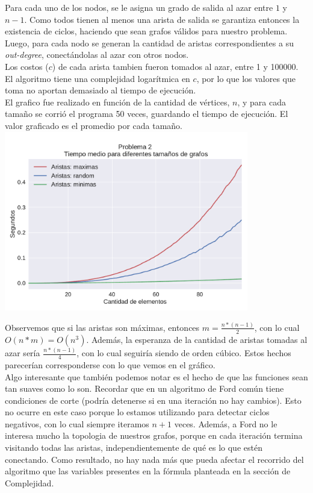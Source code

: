 Para cada uno de los nodos, se le asigna un grado de salida al azar entre $1$ y $n-1$. Como todos tienen al menos una arista de salida se garantiza entonces la existencia de ciclos, haciendo que sean grafos válidos para nuestro problema. Luego, para cada nodo se generan la cantidad de aristas correspondientes a su \textit{out-degree}, conectándolas al azar con otros nodos. \\

Los costos ($c$) de cada arista tambien fueron tomados al azar, entre 1 y 100000. El algoritmo tiene una complejidad logarítmica en $c$, por lo que los valores que toma no aportan demasiado al tiempo de ejecución. \\

El grafico fue realizado en función de la cantidad de vértices, $n$, y para cada tamaño se corrió el programa 50 veces,
guardando el tiempo de ejecución. El valor graficado es el promedio por cada tamaño. \\

{\centering
  \includegraphics[width=0.8\textwidth]{imagenes/problema2/n_aristas.pdf} \\
}

Observemos que si las aristas son máximas, entonces $m = \frac{n*(n-1)}{2}$, con lo cual $O(n*m) = O(n^3)$. Además, la esperanza de la cantidad de aristas tomadas al azar sería $\frac{n*(n-1)}{4}$, con lo cual seguiría siendo de orden cúbico. Estos hechos parecerían corresponderse con lo que vemos en el gráfico. \\

Algo interesante que también podemos notar es el hecho de que las funciones sean tan suaves como lo son. Recordar que en un algoritmo de Ford común tiene condiciones de corte (podría detenerse si en una iteración no hay cambios). Esto no ocurre en este caso porque lo estamos utilizando para detectar ciclos negativos, con lo cual siempre iteramos $n+1$ veces. Además, a Ford no le interesa mucho la topologia de nuestros grafos, porque en cada iteración termina visitando todas las aristas, independientemente  de qué es lo que estén conectando. Como resultado, no hay nada más que pueda afectar el recorrido del algoritmo que las variables presentes en la fórmula planteada en la sección de Complejidad.